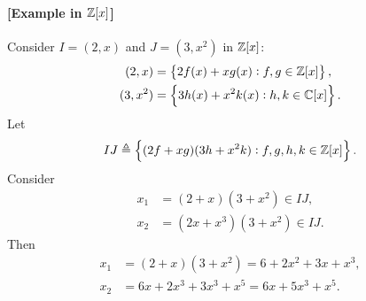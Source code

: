 \documentclass[11pt,openany]{article}
\begin{document}
\newpage
\paragraph{[Example in $\mathbb{Z}[x]$]}
Consider $I=(2,x)$ and $J=(3,x^2)$ in $\mathbb{Z}[x]$: \begin{align*}
(2,x)&=\set{2f(x)+xg(x):f,g\in\mathbb{Z}[x]},\\
(3,x^2)&=\set{3h(x)+x^2k(x):h,k\in\mathbb{C}[x]}.
\end{align*} Let \[
IJ\triangleq\set{(2f+xg)(3h+x^2k):f,g,h,k\in\mathbb{Z}[x]}.
\] Consider \begin{align*}
x_1&=(2+x)(3+x^2)\in IJ,\\
x_2&=(2x+x^3)(3+x^2)\in IJ.
\end{align*} Then \begin{align*}
x_1&=(2+x)(3+x^2)=6+2x^2+3x+x^3,\\
x_2&=6x+2x^3+3x^3+x^5=6x+5x^3+x^5.
\end{align*}
\end{document}
